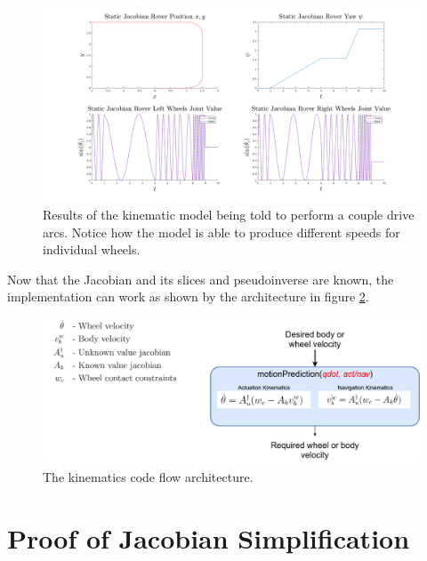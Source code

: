 \documentclass[12pt]{article}
\begin{document}
\begin{figure}
    \centering
    \includegraphics[width=\textwidth]{images/staticJacobianLeftTurn1.png}
    \caption{Results of the kinematic model being told to perform a couple drive arcs. Notice how the model is able to produce different speeds for individual wheels.}
    \label{fig:static1}
\end{figure}
Now that the Jacobian and its slices and pseudoinverse are known, the implementation can work as shown by the architecture in figure \ref{fig:code}.

\begin{figure}
    \centering
    \includegraphics[width=\textwidth]{images/controller_architecture.png}
    \caption{The kinematics code flow architecture.}
    \label{fig:code}
\end{figure}
\break
\appendix
\section{Proof of Jacobian Simplification}
\end{document}

